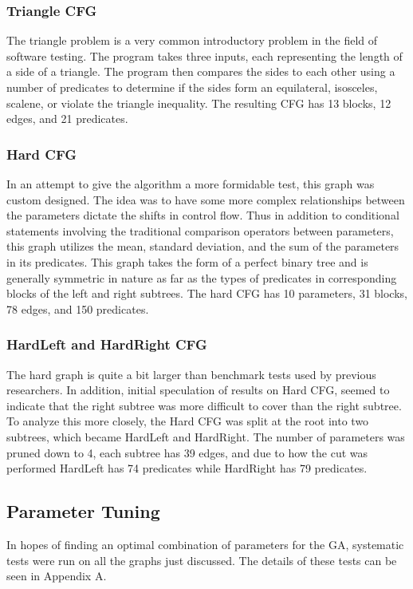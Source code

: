 \documentclass[runningheads]{llncs}
\begin{document}
\subsubsection{Triangle CFG}
The triangle problem is a very common introductory problem in the field of software testing. The program takes three inputs, each representing the length of a side of a triangle. The program then compares the sides to each other using a number of predicates to determine if the sides form an equilateral, isosceles, scalene, or violate the triangle inequality. The resulting CFG has 13 blocks, 12 edges, and 21 predicates.

\subsubsection{Hard CFG}
In an attempt to give the algorithm a more formidable test, this graph was custom designed. The idea was to have some more complex relationships between the parameters dictate the shifts in control flow. Thus in addition to conditional statements involving the traditional comparison operators between parameters, this graph utilizes the mean, standard deviation, and the sum of the parameters in its predicates. This graph takes the form of a perfect binary tree and is generally symmetric in nature as far as the types of predicates in corresponding blocks of the left and right subtrees. The hard CFG has 10 parameters, 31 blocks, 78 edges, and 150 predicates.

\subsubsection{HardLeft and HardRight CFG}
The hard graph is quite a bit larger than benchmark tests used by previous researchers. In addition, initial speculation of results on Hard CFG, seemed to indicate that the right subtree was more difficult to cover than the right subtree. To analyze this more closely, the Hard CFG was split at the root into two subtrees, which became HardLeft and HardRight. The number of parameters was pruned down to 4, each subtree has 39 edges, and due to how the cut was performed HardLeft has 74 predicates while HardRight has 79 predicates.

\subsection{Parameter Tuning} 
In hopes of finding an optimal combination of parameters for the GA, systematic tests were run on all the graphs just discussed. The details of these tests can be seen in Appendix A.
\end{document}
